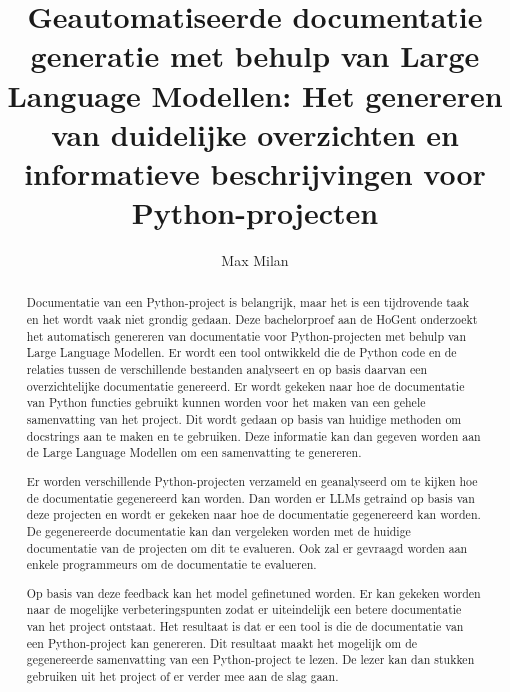 \documentclass{hogent-article}
\title{Geautomatiseerde documentatie generatie met behulp van Large Language Modellen: Het genereren van duidelijke overzichten en informatieve beschrijvingen voor\\ Python-projecten}
\author{Max Milan}
\begin{document}
\begin{abstract}
Documentatie van een Python-project is belangrijk, maar het is een tijdrovende taak en het wordt vaak niet grondig gedaan.
Deze bachelorproef aan de HoGent onderzoekt het automatisch genereren van documentatie voor Python-projecten met behulp van Large Language Modellen.
Er wordt een tool ontwikkeld die de Python code en de relaties tussen de verschillende bestanden analyseert en op basis daarvan een overzichtelijke documentatie genereerd.
Er wordt gekeken naar hoe de documentatie van Python functies gebruikt kunnen worden voor het maken van een gehele samenvatting van het project.
Dit wordt gedaan op basis van huidige methoden om docstrings aan te maken en te gebruiken.
Deze informatie kan dan gegeven worden aan de Large Language Modellen om een samenvatting te genereren.

Er worden verschillende Python-projecten verzameld en geanalyseerd om te kijken hoe de documentatie gegenereerd kan worden.
Dan worden er LLMs getraind op basis van deze projecten en wordt er gekeken naar hoe de documentatie gegenereerd kan worden.
De gegenereerde documentatie kan dan vergeleken worden met de huidige documentatie van de projecten om dit te evalueren.
Ook zal er gevraagd worden aan enkele programmeurs om de documentatie te evalueren.

Op basis van deze feedback kan het model gefinetuned worden. Er kan gekeken worden naar de mogelijke verbeteringspunten zodat er uiteindelijk een betere documentatie van het project ontstaat.
Het resultaat is dat er een tool is die de documentatie van een Python-project kan genereren.
Dit resultaat maakt het mogelijk om de gegenereerde samenvatting van een Python-project te lezen. De lezer kan dan stukken gebruiken uit het project of er verder mee aan de slag gaan.
\end{abstract}

\tableofcontents



\printbibliography[heading=bibintec]
\end{document}
